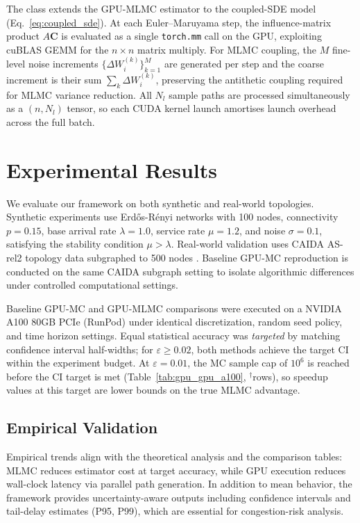\documentclass[pdflatex,sn-mathphys-num]{sn-jnl}
\theoremstyle{thmstyleone}%
\theoremstyle{thmstyletwo}%
\theoremstyle{thmstylethree}%
\begin{document}
The  class extends the GPU-MLMC estimator to the coupled-SDE
model (Eq.~\eqref{eq:coupled_sde}). At each Euler--Maruyama step, the influence-matrix product
$A\mathbf{C}$ is evaluated as a single \texttt{torch.mm} call on the GPU, exploiting cuBLAS GEMM
for the $n \times n$ matrix multiply. For MLMC coupling, the $M$ fine-level noise increments
$\{\Delta W_i^{(k)}\}_{k=1}^{M}$ are generated per step and the coarse increment is their sum
$\sum_k \Delta W_i^{(k)}$, preserving the antithetic coupling required for MLMC variance
reduction. All $N_l$ sample paths are processed simultaneously as a $(n{,}N_l)$ tensor, so each
CUDA kernel launch amortises launch overhead across the full batch.

\section{Experimental Results}

We evaluate our framework on both synthetic and real-world topologies. Synthetic experiments use
Erd\H{o}s-R\'enyi networks with 100 nodes, connectivity $p=0.15$, base arrival rate $\lambda=1.0$,
service rate $\mu=1.2$, and noise $\sigma=0.1$, satisfying the stability condition $\mu > \lambda$.
Real-world validation uses CAIDA AS-rel2 topology data subgraphed to 500 nodes
\cite{hofstad2016}. Baseline GPU-MC reproduction is conducted on the same CAIDA subgraph setting
to isolate algorithmic differences under controlled computational settings.

Baseline GPU-MC and GPU-MLMC comparisons were executed on a NVIDIA A100 80GB PCIe (RunPod)
under identical discretization, random seed policy, and time horizon settings. Equal statistical
accuracy was \emph{targeted} by matching confidence interval half-widths; for $\varepsilon \geq
0.02$, both methods achieve the target CI within the experiment budget. At $\varepsilon=0.01$,
the MC sample cap of $10^6$ is reached before the CI target is met
(Table~\ref{tab:gpu_gpu_a100}, $^\dagger$rows), so speedup values at this target are lower bounds
on the true MLMC advantage.

\subsection{Empirical Validation}

Empirical trends align with the theoretical analysis and the comparison tables: MLMC reduces
estimator cost at target accuracy, while GPU execution reduces wall-clock latency via parallel
path generation. In addition to mean behavior, the framework provides uncertainty-aware outputs
including confidence intervals and tail-delay estimates (P95, P99), which are essential for
congestion-risk analysis.
\end{document}
